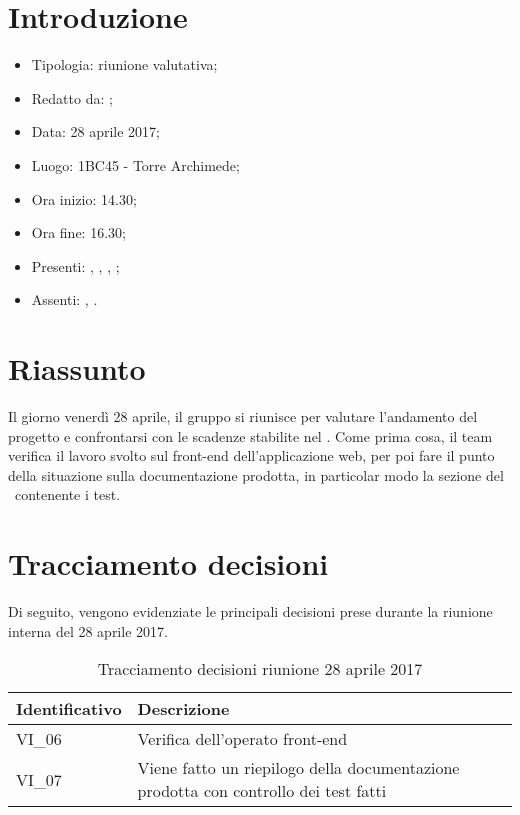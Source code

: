 \section{Introduzione}

	\begin{itemize}
		\item Tipologia: riunione valutativa;
		\item Redatto da: \DS;
		\item Data: 28 aprile 2017;
		\item Luogo: 1BC45 - Torre Archimede;
		\item Ora inizio: 14.30;
		\item Ora fine: 16.30;
		\item Presenti: \AN, \DS, \AS, \NS;	
		\item Assenti: \MC, \DAN.
	\end{itemize}

\section{Riassunto}
Il giorno venerdì 28 aprile, il gruppo si riunisce per valutare l'andamento del progetto e confrontarsi con le scadenze stabilite nel \PdP.
Come prima cosa, il team verifica il lavoro svolto sul front-end dell'applicazione web, per poi fare il punto della situazione sulla documentazione prodotta, in particolar modo la sezione del \PdQ\ contenente i test.

\section{Tracciamento decisioni}
Di seguito, vengono evidenziate le principali decisioni prese durante la riunione interna del 28 aprile 2017.

\begin{table}[H]
	\begin{center}
		\begin{tabular}{|p{3cm}| p{11cm}|}
			\hline
			\textbf{Identificativo}	& \textbf{Descrizione} \\
			\hline
			VI\_06	&  Verifica dell'operato front-end \\
			\hline
			VI\_07 &  Viene fatto un riepilogo della documentazione prodotta con controllo dei test fatti \\
			\hline
		\end{tabular}
		\caption{Tracciamento decisioni riunione 28 aprile 2017}
	\end{center}
\end{table}